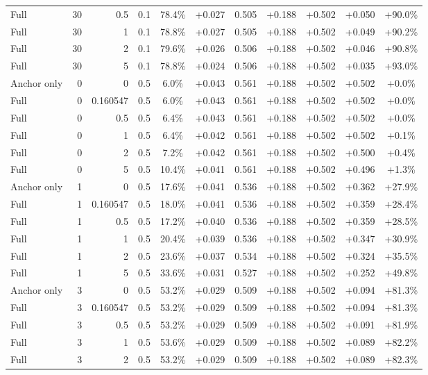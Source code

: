 \begin{table}[htbp]
\begin{tabular}{lrrrccccccc}
Full & 30 & 0.5 & 0.1 & 78.4\% & +0.027 & 0.505 & +0.188 & +0.502 & +0.050 & +90.0\% \\
Full & 30 & 1 & 0.1 & 78.8\% & +0.027 & 0.505 & +0.188 & +0.502 & +0.049 & +90.2\% \\
Full & 30 & 2 & 0.1 & 79.6\% & +0.026 & 0.506 & +0.188 & +0.502 & +0.046 & +90.8\% \\
Full & 30 & 5 & 0.1 & 78.8\% & +0.024 & 0.506 & +0.188 & +0.502 & +0.035 & +93.0\% \\
Anchor only & 0 & 0 & 0.5 & 6.0\% & +0.043 & 0.561 & +0.188 & +0.502 & +0.502 & +0.0\% \\
Full & 0 & 0.160547 & 0.5 & 6.0\% & +0.043 & 0.561 & +0.188 & +0.502 & +0.502 & +0.0\% \\
Full & 0 & 0.5 & 0.5 & 6.4\% & +0.043 & 0.561 & +0.188 & +0.502 & +0.502 & +0.0\% \\
Full & 0 & 1 & 0.5 & 6.4\% & +0.042 & 0.561 & +0.188 & +0.502 & +0.502 & +0.1\% \\
Full & 0 & 2 & 0.5 & 7.2\% & +0.042 & 0.561 & +0.188 & +0.502 & +0.500 & +0.4\% \\
Full & 0 & 5 & 0.5 & 10.4\% & +0.041 & 0.561 & +0.188 & +0.502 & +0.496 & +1.3\% \\
Anchor only & 1 & 0 & 0.5 & 17.6\% & +0.041 & 0.536 & +0.188 & +0.502 & +0.362 & +27.9\% \\
Full & 1 & 0.160547 & 0.5 & 18.0\% & +0.041 & 0.536 & +0.188 & +0.502 & +0.359 & +28.4\% \\
Full & 1 & 0.5 & 0.5 & 17.2\% & +0.040 & 0.536 & +0.188 & +0.502 & +0.359 & +28.5\% \\
Full & 1 & 1 & 0.5 & 20.4\% & +0.039 & 0.536 & +0.188 & +0.502 & +0.347 & +30.9\% \\
Full & 1 & 2 & 0.5 & 23.6\% & +0.037 & 0.534 & +0.188 & +0.502 & +0.324 & +35.5\% \\
Full & 1 & 5 & 0.5 & 33.6\% & +0.031 & 0.527 & +0.188 & +0.502 & +0.252 & +49.8\% \\
Anchor only & 3 & 0 & 0.5 & 53.2\% & +0.029 & 0.509 & +0.188 & +0.502 & +0.094 & +81.3\% \\
Full & 3 & 0.160547 & 0.5 & 53.2\% & +0.029 & 0.509 & +0.188 & +0.502 & +0.094 & +81.3\% \\
Full & 3 & 0.5 & 0.5 & 53.2\% & +0.029 & 0.509 & +0.188 & +0.502 & +0.091 & +81.9\% \\
Full & 3 & 1 & 0.5 & 53.6\% & +0.029 & 0.509 & +0.188 & +0.502 & +0.089 & +82.2\% \\
Full & 3 & 2 & 0.5 & 53.2\% & +0.029 & 0.509 & +0.188 & +0.502 & +0.089 & +82.3\% \\

\end{tabular}
\end{table}
